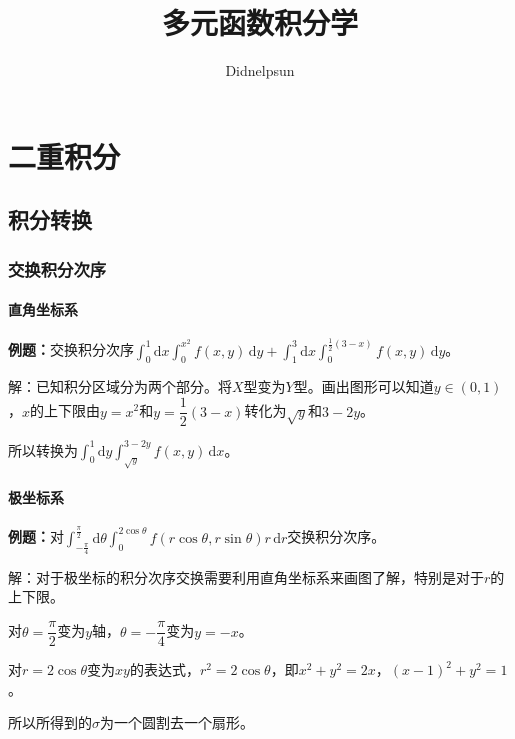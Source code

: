 \documentclass[UTF8, 12pt]{ctexart}
\author{Didnelpsun}
\title{多元函数积分学}
\date{}
\begin{document}
\maketitle
\pagestyle{empty}
\thispagestyle{empty}
\tableofcontents
\thispagestyle{empty}
\newpage
\pagestyle{plain}
\setcounter{page}{1}
\section{二重积分}

\subsection{积分转换}

\subsubsection{交换积分次序}

\paragraph{直角坐标系} \leavevmode \medskip

\textbf{例题：}交换积分次序$\int_0^1\textrm{d}x\int_0^{x^2}f(x,y)\,\textrm{d}y+\int_1^3\textrm{d}x\int_0^{\frac{1}{2}(3-x)}f(x,y)\,\textrm{d}y$。

解：已知积分区域分为两个部分。将$X$型变为$Y$型。画出图形可以知道$y\in(0,1)$，$x$的上下限由$y=x^2$和$y=\dfrac{1}{2}(3-x)$转化为$\sqrt{y}$和$3-2y$。

所以转换为$\int_0^1\textrm{d}y\int_{\sqrt{y}}^{3-2y}f(x,y)\,\textrm{d}x$。

\paragraph{极坐标系} \leavevmode \medskip

\textbf{例题：}对$\int_{-\frac{\pi}{4}}^{\frac{\pi}{2}}\textrm{d}\theta\int_0^{2\cos\theta}f(r\cos\theta,r\sin\theta)r\,\textrm{d}r$交换积分次序。

解：对于极坐标的积分次序交换需要利用直角坐标系来画图了解，特别是对于$r$的上下限。

对$\theta=\dfrac{\pi}{2}$变为$y$轴，$\theta=-\dfrac{\pi}{4}$变为$y=-x$。

对$r=2\cos\theta$变为$xy$的表达式，$r^2=2\cos\theta$，即$x^2+y^2=2x$，$(x-1)^2+y^2=1$。

所以所得到的$\sigma$为一个圆割去一个扇形。
\end{document}
